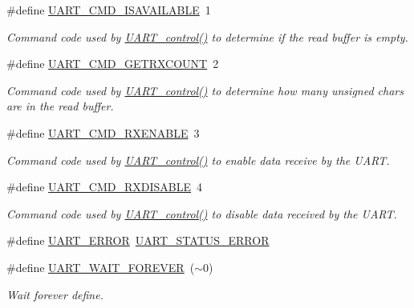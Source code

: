 \begin{DoxyCompactItemize}
\#define \hyperlink{group___u_a_r_t___c_m_d_gaf5be6db621c5b048637dc93b26797693}{U\+A\+R\+T\+\_\+\+C\+M\+D\+\_\+\+I\+S\+A\+V\+A\+I\+L\+A\+B\+L\+E}~1
\begin{DoxyCompactList}\small\item\em Command code used by \hyperlink{_u_a_r_t_8h_a9de3c26cfe4ce6b7f350a6ea6e16801d}{U\+A\+R\+T\+\_\+control()} to determine if the read buffer is empty. \end{DoxyCompactList}\item 
\#define \hyperlink{group___u_a_r_t___c_m_d_ga470321cbd9eccf137ffbe6553ae7f35f}{U\+A\+R\+T\+\_\+\+C\+M\+D\+\_\+\+G\+E\+T\+R\+X\+C\+O\+U\+N\+T}~2
\begin{DoxyCompactList}\small\item\em Command code used by \hyperlink{_u_a_r_t_8h_a9de3c26cfe4ce6b7f350a6ea6e16801d}{U\+A\+R\+T\+\_\+control()} to determine how many unsigned chars are in the read buffer. \end{DoxyCompactList}\item 
\#define \hyperlink{group___u_a_r_t___c_m_d_gad67d01fa376f25bb28141d819647e8d3}{U\+A\+R\+T\+\_\+\+C\+M\+D\+\_\+\+R\+X\+E\+N\+A\+B\+L\+E}~3
\begin{DoxyCompactList}\small\item\em Command code used by \hyperlink{_u_a_r_t_8h_a9de3c26cfe4ce6b7f350a6ea6e16801d}{U\+A\+R\+T\+\_\+control()} to enable data receive by the U\+A\+R\+T. \end{DoxyCompactList}\item 
\#define \hyperlink{group___u_a_r_t___c_m_d_gac0b19ce2fa9f43d3fe255bcdbd3cda7b}{U\+A\+R\+T\+\_\+\+C\+M\+D\+\_\+\+R\+X\+D\+I\+S\+A\+B\+L\+E}~4
\begin{DoxyCompactList}\small\item\em Command code used by \hyperlink{_u_a_r_t_8h_a9de3c26cfe4ce6b7f350a6ea6e16801d}{U\+A\+R\+T\+\_\+control()} to disable data received by the U\+A\+R\+T. \end{DoxyCompactList}\item 
\#define \hyperlink{_u_a_r_t_8h_a7e3562e7931cf51b41a32d8109072251}{U\+A\+R\+T\+\_\+\+E\+R\+R\+O\+R}~\hyperlink{group___u_a_r_t___s_t_a_t_u_s_ga2ae076f4aae13ca8e2aea674207df0ad}{U\+A\+R\+T\+\_\+\+S\+T\+A\+T\+U\+S\+\_\+\+E\+R\+R\+O\+R}
\item 
\#define \hyperlink{_u_a_r_t_8h_ada620b673241eb6335a71e75da291716}{U\+A\+R\+T\+\_\+\+W\+A\+I\+T\+\_\+\+F\+O\+R\+E\+V\+E\+R}~($\sim$0)
\begin{DoxyCompactList}\small\item\em Wait forever define. \end{DoxyCompactList}\end{DoxyCompactItemize}
